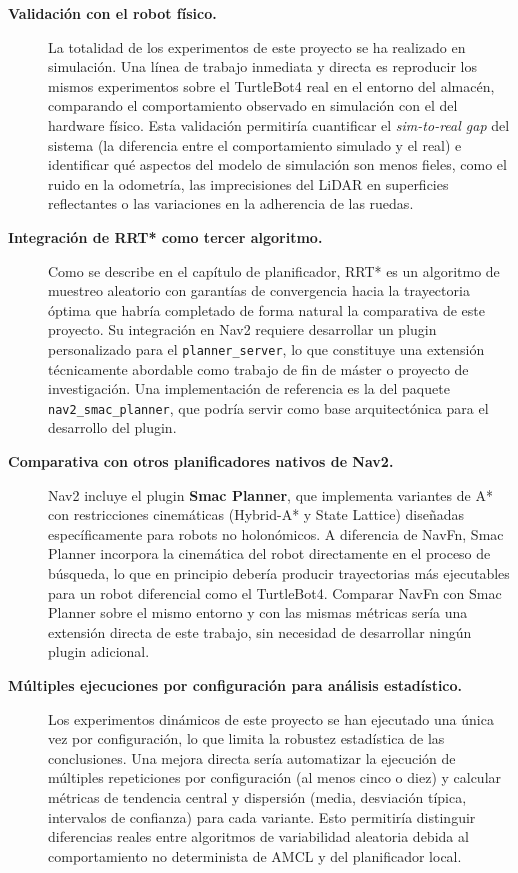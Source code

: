 \begin{description}

    \item[\textbf{Validación con el robot físico.}] \hfill\break
    La totalidad de los experimentos de este proyecto se ha realizado en simulación. Una línea de trabajo inmediata y directa es reproducir los mismos experimentos sobre el TurtleBot4 real en el entorno del almacén, comparando el comportamiento observado en simulación con el del hardware físico. Esta validación permitiría cuantificar el \textit{sim-to-real gap} del sistema (la diferencia entre el comportamiento simulado y el real) e identificar qué aspectos del modelo de simulación son menos fieles, como el ruido en la odometría, las imprecisiones del LiDAR en superficies reflectantes o las variaciones en la adherencia de las ruedas.

    \item[\textbf{Integración de RRT* como tercer algoritmo.}] \hfill\break
    Como se describe en el capítulo de planificador, RRT* es un algoritmo de muestreo aleatorio con garantías de convergencia hacia la trayectoria óptima que habría completado de forma natural la comparativa de este proyecto. Su integración en Nav2 requiere desarrollar un plugin personalizado para el \texttt{planner\_server}, lo que constituye una extensión técnicamente abordable como trabajo de fin de máster o proyecto de investigación. Una implementación de referencia es la del paquete \texttt{nav2\_smac\_planner}, que podría servir como base arquitectónica para el desarrollo del plugin.

    \item[\textbf{Comparativa con otros planificadores nativos de Nav2.}] \hfill\break
    Nav2 incluye el plugin \textbf{Smac Planner}\cite{macenski2024smac}, que implementa variantes de A* con restricciones cinemáticas (Hybrid-A* y State Lattice) diseñadas específicamente para robots no holonómicos. A diferencia de NavFn, Smac Planner incorpora la cinemática del robot directamente en el proceso de búsqueda, lo que en principio debería producir trayectorias más ejecutables para un robot diferencial como el TurtleBot4. Comparar NavFn con Smac Planner sobre el mismo entorno y con las mismas métricas sería una extensión directa de este trabajo, sin necesidad de desarrollar ningún plugin adicional.

    \item[\textbf{Múltiples ejecuciones por configuración para análisis estadístico.}] \hfill\break
    Los experimentos dinámicos de este proyecto se han ejecutado una única vez por configuración, lo que limita la robustez estadística de las conclusiones. Una mejora directa sería automatizar la ejecución de múltiples repeticiones por configuración (al menos cinco o diez) y calcular métricas de tendencia central y dispersión (media, desviación típica, intervalos de confianza) para cada variante. Esto permitiría distinguir diferencias reales entre algoritmos de variabilidad aleatoria debida al comportamiento no determinista de AMCL y del planificador local.


\end{description}
